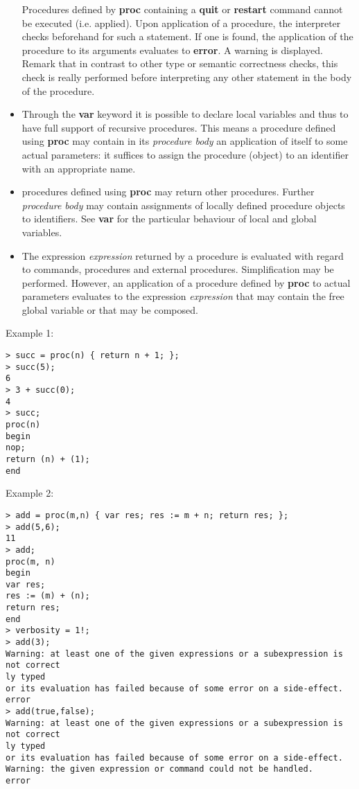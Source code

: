 \begin{itemize}
   Procedures defined by \textbf{proc} containing a \textbf{quit} or \textbf{restart} command
   cannot be executed (i.e. applied). Upon application of a procedure,
   the \sollya interpreter checks beforehand for such a statement. If one
   is found, the application of the procedure to its arguments evaluates
   to \textbf{error}. A warning is displayed. Remark that in contrast to other
   type or semantic correctness checks, this check is really performed
   before interpreting any other statement in the body of the procedure.

\item Through the \textbf{var} keyword it is possible to declare local
   variables and thus to have full support of recursive procedures. This
   means a procedure defined using \textbf{proc} may contain in its \emph{procedure body} 
   an application of itself to some actual parameters: it suffices
   to assign the procedure (object) to an identifier with an appropriate
   name.

\item \sollya procedures defined using \textbf{proc} may return other
   procedures. Further \emph{procedure body} may contain assignments of
   locally defined procedure objects to identifiers. See \textbf{var} for the
   particular behaviour of local and global variables.

\item The expression \emph{expression} returned by a procedure is evaluated with
   regard to \sollya commands, procedures and external
   procedures. Simplification may be performed.  However, an application
   of a procedure defined by \textbf{proc} to actual parameters evaluates to the
   expression \emph{expression} that may contain the free global variable or
   that may be composed.
\end{itemize}
\noindent Example 1: 
\begin{center}\begin{minipage}{15cm}\begin{Verbatim}[frame=single]
> succ = proc(n) { return n + 1; };
> succ(5);
6
> 3 + succ(0);
4
> succ;
proc(n)
begin
nop;
return (n) + (1);
end
\end{Verbatim}
\end{minipage}\end{center}
\noindent Example 2: 
\begin{center}\begin{minipage}{15cm}\begin{Verbatim}[frame=single]
> add = proc(m,n) { var res; res := m + n; return res; };
> add(5,6);
11
> add;
proc(m, n)
begin
var res;
res := (m) + (n);
return res;
end
> verbosity = 1!;
> add(3);
Warning: at least one of the given expressions or a subexpression is not correct
ly typed
or its evaluation has failed because of some error on a side-effect.
error
> add(true,false);
Warning: at least one of the given expressions or a subexpression is not correct
ly typed
or its evaluation has failed because of some error on a side-effect.
Warning: the given expression or command could not be handled.
error
\end{Verbatim}
\end{minipage}\end{center}
